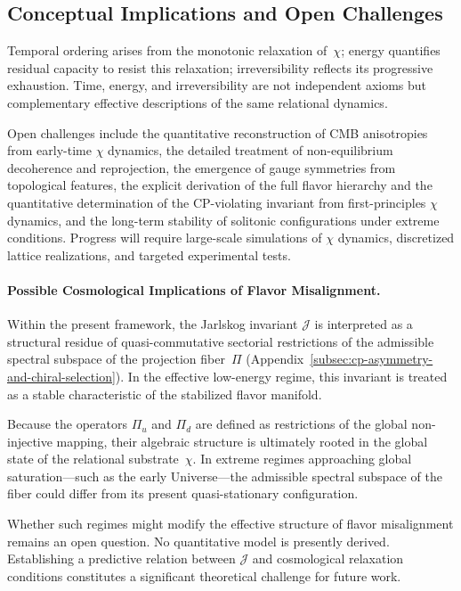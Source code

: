 \subsection{Conceptual Implications and Open Challenges}
  \label{subsec:conceptual-implications-and-open-challenges}

  Temporal ordering arises from the monotonic relaxation of~$\chi$; energy quantifies residual capacity to resist this
  relaxation; irreversibility reflects its progressive exhaustion.
  Time, energy, and irreversibility are not independent axioms but complementary effective descriptions of the same
  relational dynamics.

  Open challenges include the quantitative reconstruction of CMB anisotropies from early-time $\chi$
  dynamics, the detailed
  treatment of non-equilibrium decoherence and reprojection, the emergence of gauge symmetries from topological
  features, the explicit derivation of the full flavor hierarchy and the quantitative determination of the
  CP-violating invariant from first-principles $\chi$ dynamics, and the long-term stability of solitonic configurations
  under extreme conditions.
  Progress will require large-scale simulations of $\chi$ dynamics, discretized lattice realizations, and targeted
  experimental tests.

  \paragraph{Possible Cosmological Implications of Flavor Misalignment.}

    Within the present framework, the Jarlskog invariant $\mathcal{J}$ is interpreted as a structural residue of
    quasi-commutative sectorial restrictions of the admissible spectral subspace
    of the projection fiber~$\Pi$ (Appendix~\ref{subsec:cp-asymmetry-and-chiral-selection}).
    In the effective low-energy regime, this invariant is treated as
    a stable characteristic of the stabilized flavor manifold.

    Because the operators $\Pi_u$ and $\Pi_d$ are defined as
    restrictions of the global non-injective mapping,
    their algebraic structure is ultimately rooted in the global
    state of the relational substrate~$\chi$.
    In extreme regimes approaching global saturation---such as the
    early Universe---the admissible spectral subspace of the fiber
    could differ from its present quasi-stationary configuration.

    Whether such regimes might modify the effective structure of
    flavor misalignment remains an open question.
    No quantitative model is presently derived.
    Establishing a predictive relation between $\mathcal{J}$ and
    cosmological relaxation conditions constitutes a significant
    theoretical challenge for future work.

